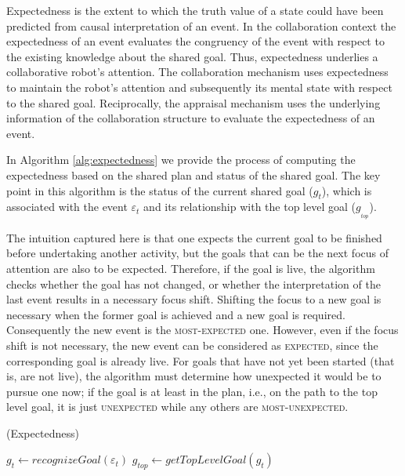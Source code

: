 Expectedness is the extent to which the truth value of a state could have been
predicted from causal interpretation of an event. In the collaboration context
the expectedness of an event evaluates the congruency of the event with respect
to the existing knowledge about the shared goal. Thus, expectedness underlies a
collaborative robot's attention. The collaboration mechanism uses expectedness
to maintain the robot's attention and subsequently its mental state with respect
to the shared goal. Reciprocally, the appraisal mechanism uses the underlying
information of the collaboration structure to evaluate the expectedness of an
event.

In Algorithm \ref{alg:expectedness} we provide the process of computing the
expectedness based on the shared plan and status of the shared goal. The key
point in this algorithm is the status of the current shared goal
($\mathit{g}_{t}$), which is associated with the event $\varepsilon_t$ and its
relationship with the top level goal ($\mathit{g}_{_{top}}$).

The intuition captured here is that one expects the current goal to be finished
before undertaking another activity, but the goals that can be the next focus of
attention are also to be expected. Therefore, if the goal is live, the algorithm
checks whether the goal has not changed, or whether the interpretation of the
last event results in a necessary focus shift. Shifting the focus to a new goal
is necessary when the former goal is achieved and a new goal is required.
Consequently the new event is the \textsc{most-expected} one. However, even if
the focus shift is not necessary, the new event can be considered as
\textsc{expected}, since the corresponding goal is already live. For goals that
have not yet been started (that is, are not live), the algorithm must determine
how unexpected it would be to pursue one now; if the goal is at least in the
plan, i.e., on the path to the top level goal, it is just \textsc{unexpected}
while any others are \textsc{most-unexpected}.

\begin{algorithm}[t]
	\caption{(Expectedness)}
	\label{alg:expectedness}
	\begin{algorithmic}[1]
			\Statex
			\State $\mathit{g}_{t} \gets \textit{recognizeGoal}{(\varepsilon_t)}$
			\State $\mathit{g}_{top} \gets \textit{getTopLevelGoal}{(\mathit{g}_{t})}$
			\Statex
				\State {}
				\Else
					\State {}
				\EndIf
			\Else
					\State {}
				\Else
					\State {}
				\EndIf
			\EndIf
		\EndFunction
	\end{algorithmic}
\end{algorithm}

